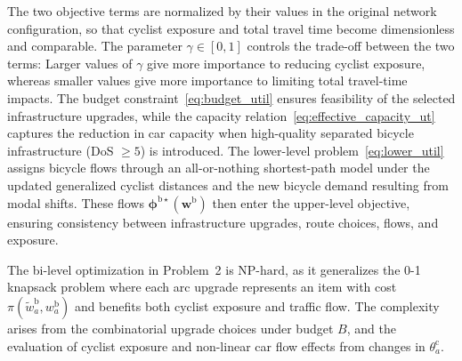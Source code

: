 \documentclass[lettersize,journal]{IEEEtran}
\begin{document}
The two objective terms are normalized by their values in the original network configuration, so that cyclist exposure and total travel time become dimensionless and comparable. The parameter $\gamma \in [0,1]$ controls the trade-off between the two terms: Larger values of $\gamma$ give more importance to reducing cyclist exposure, whereas smaller values give more importance to limiting total travel-time impacts. The budget constraint~\eqref{eq:budget_util} ensures feasibility of the selected infrastructure upgrades, while the capacity relation~\eqref{eq:effective_capacity_ut} captures the reduction in car capacity when high-quality separated bicycle infrastructure (DoS $\geq 5$) is introduced. The lower-level problem~\eqref{eq:lower_util} assigns bicycle flows through an all-or-nothing shortest-path model under the updated generalized cyclist distances and the new bicycle demand resulting from modal shifts. These flows $\boldsymbol{\phi}^{\mathrm{b}\star}(\boldsymbol{w}^\mathrm{b})$ then enter the upper-level objective, ensuring consistency between infrastructure upgrades, route choices, flows, and exposure.


The bi-level optimization in Problem~2 is $\text{NP}\text{-hard}$, as it generalizes the 0-1 knapsack problem where each arc upgrade represents an item with cost $\pi(\tilde{w}_a^\mathrm{b},w_a^\mathrm{b})$ and  benefits both  cyclist exposure and traffic flow. The complexity arises from the combinatorial upgrade choices under budget $B$, and the evaluation of cyclist exposure and non-linear car flow effects from changes in $\theta_a^\mathrm{c}$.

\end{document}
